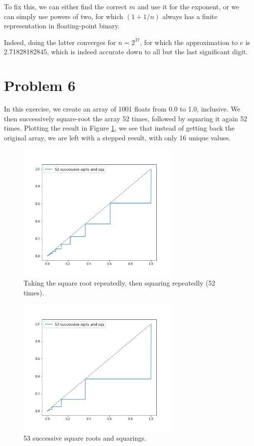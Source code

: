 \documentclass[12pt]{article}
\begin{document}
To fix this, we can either find the correct $m$ and use it for the exponent, or we can simply use powers of two, for which $(1 + 1/n)$ always has a finite representation in floating-point binary.

Indeed, doing the latter converges for $n = 2^{37}$, for which the approximation to $e$ is 2.71828182845, which is indeed accurate down to all but the last significant digit. 


\section*{Problem 6}

In this exercise, we create an array of 1001 floats from 0.0 to 1.0, inclusive. We then successively square-root the array 52 times, followed by squaring it again 52 times. Plotting the result in Figure \ref{fig:sqrt_52}, we see that instead of getting back the original array, we are left with a stepped result, with only 16 unique values.

\begin{figure}[ht!]
\centering
\includegraphics[width=8cm]{sqrt_52.png}
\caption{Taking the square root repeatedly, then squaring repeatedly (52 times).}\label{fig:sqrt_52}
\end{figure}

\begin{figure}[ht!]
\centering
\includegraphics[width=8cm]{sqrt_53.png}
\caption{53 successive square roots and squarings.}\label{fig:sqrt_53}
\end{figure}
\end{document}
